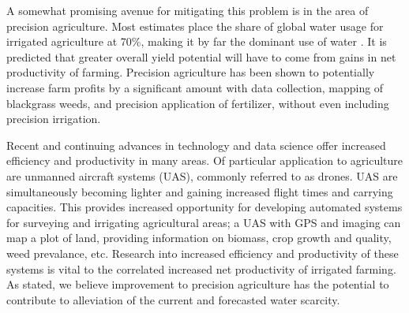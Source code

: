 A somewhat promising avenue for mitigating this problem is in the area of precision agriculture.
Most estimates place the share of global water usage for irrigated agriculture at 70\%, making it by far the dominant use of water \cite{waterscarce}.
It is predicted that greater overall yield potential will have to come from gains in net productivity of farming.
Precision agriculture has been shown to potentially increase farm profits by a significant amount with data collection, mapping of blackgrass weeds, and precision application of fertilizer, without even including precision irrigation\cite{precisionagfuture}.


Recent and continuing advances in technology and data science offer increased efficiency and productivity in many areas.
Of particular application to agriculture are unmanned aircraft systems (UAS), commonly referred to as drones.
UAS are simultaneously becoming lighter and gaining increased flight times and carrying capacities.
This provides increased opportunity for developing automated systems for surveying and irrigating agricultural areas; a UAS with GPS and imaging can map a plot of land, providing information on biomass, crop growth and quality, weed prevalance, etc.
Research into increased efficiency and productivity of these systems is vital to the correlated increased net productivity of irrigated farming.
As stated, we believe improvement to precision agriculture has the potential to contribute to alleviation of the current and forecasted water scarcity.





